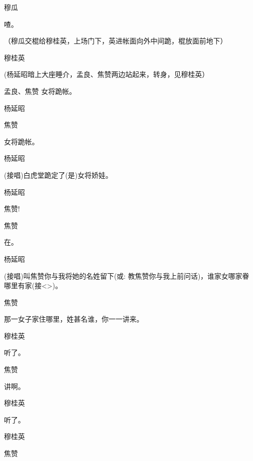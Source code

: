 {穆瓜\hspace{30pt}~

喳。

（穆瓜交棍给穆桂英，上场门下，英进帐面向外中间跪，棍放面前地下）

穆桂英\hspace{20pt}~


(杨延昭暗上大座睡介，孟良、焦赞两边站起来，转身，见穆桂英）

孟良、焦赞 女将跪帐。

杨延昭


焦赞\hspace{30pt}~

女将跪帐。

杨延昭\hspace{20pt}~

(接唱)白虎堂跪定了(是)女将娇娃。

杨延昭\hspace{20pt}~

焦赞!

焦赞\hspace{30pt}~

在。

杨延昭

(接唱)叫焦赞你与我将她的名姓留下({\akai 或}: 教焦赞你与我上前问话)，谁家女哪家眷哪里有家(接\textless{}\!\textgreater{})。

焦赞\hspace{30pt}~

那一女子家住哪里，姓甚名谁，你一一讲来。

穆桂英\hspace{20pt}~

听了。

焦赞\hspace{30pt}~

讲啊。

穆桂英\hspace{20pt}~

听了。

穆桂英\hspace{20pt}~


焦赞

}
